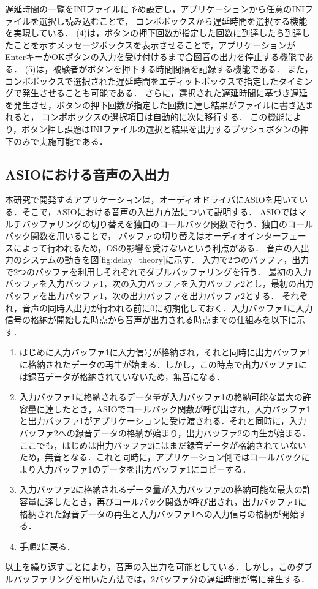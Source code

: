 遅延時間の一覧をINIファイルに予め設定し，アプリケーションから任意のINIファイルを選択し読み込むことで，
コンボボックスから遅延時間を選択する機能を実現している．
(4)は，ボタンの押下回数が指定した回数に到達したら到達したことを示すメッセージボックスを表示させることで，アプリケーションがEnterキーかOKボタンの入力を受け付けるまで合図音の出力を停止する機能である．
(5)は，被験者がボタンを押下する時間間隔を記録する機能である．
また，コンボボックスで選択された遅延時間をエディットボックスで指定したタイミングで発生させることも可能である．
さらに，選択された遅延時間に基づき遅延を発生させ，ボタンの押下回数が指定した回数に達し結果がファイルに書き込まれると，
コンボボックスの選択項目は自動的に次に移行する．
この機能により，ボタン押し課題はINIファイルの選択と結果を出力するプッシュボタンの押下のみで実施可能である．
\subsection{ASIOにおける音声の入出力}
本研究で開発するアプリケーションは，オーディオドライバにASIOを用いている．そこで，ASIOにおける音声の入出力方法について説明する．
ASIOではマルチバッファリングの切り替えを独自のコールバック関数で行う．独自のコールバック関数を用いることで，
バッファの切り替えはオーディオインターフェースによって行われるため，OSの影響を受けないという利点がある．
音声の入出力のシステムの動きを図\ref{fig:delay_theory}に示す．
入力で2つのバッファ，出力で2つのバッファを利用しそれぞれでダブルバッファリングを行う．
最初の入力バッファを入力バッファ1，次の入力バッファを入力バッファ2とし，最初の出力バッファを出力バッファ1，次の出力バッファを出力バッファ2とする．
それぞれ，音声の同時入出力が行われる前に0に初期化しておく．入力バッファ1に入力信号の格納が開始した時点から音声が出力される時点までの仕組みを以下に示す．
\begin{enumerate}[leftmargin=*]
\item はじめに入力バッファ1に入力信号が格納され，それと同時に出力バッファ1に格納されたデータの再生が始まる．しかし，この時点で出力バッファ1には録音データが格納されていないため，無音になる．
\item 入力バッファ1に格納されるデータ量が入力バッファ1の格納可能な最大の許容量に達したとき，ASIOでコールバック関数が呼び出され，入力バッファ1と出力バッファ1がアプリケーションに受け渡される．それと同時に，入力バッファ2への録音データの格納が始まり，出力バッファ2の再生が始まる．ここでも，はじめは出力バッファ2にはまだ録音データが格納されていないため，無音となる．これと同時に，アプリケーション側ではコールバックにより入力バッファ1のデータを出力バッファ1にコピーする．
\item 入力バッファ2に格納されるデータ量が入力バッファ2の格納可能な最大の許容量に達したとき，再びコールバック関数が呼び出され，出力バッファ1に格納された録音データの再生と入力バッファ1への入力信号の格納が開始する．
\item 手順2に戻る．
\end{enumerate}
以上を繰り返すことにより，音声の入出力を可能としている．しかし，このダブルバッファリングを用いた方法では，2バッファ分の遅延時間が常に発生する．
